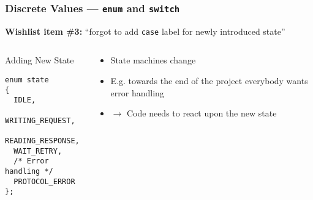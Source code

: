 \begin{frame}[fragile]
  \frametitle{Discrete Values --- \texttt{enum} and \texttt{switch}}

  \textbf{Wishlist item \#3:} ``forgot to add \texttt{case} label for
  newly introduced state''

  \begin{columns}[t]

    \begin{column}{.4\textwidth}

      \begin{block}{Adding New State}
\begin{verbatim}
enum state
{
  IDLE,
  WRITING_REQUEST,
  READING_RESPONSE,
  WAIT_RETRY,
  /* Error handling */
  PROTOCOL_ERROR
};
\end{verbatim}
      \end{block}

    \end{column}

    \begin{column}{.4\textwidth}

      \begin{itemize}
      \item State machines change
      \item E.g. towards the end of the project everybody wants error
        handling
      \item $\to$ Code needs to react upon the new state
      \end{itemize}

    \end{column}

  \end{columns}

\end{frame}

